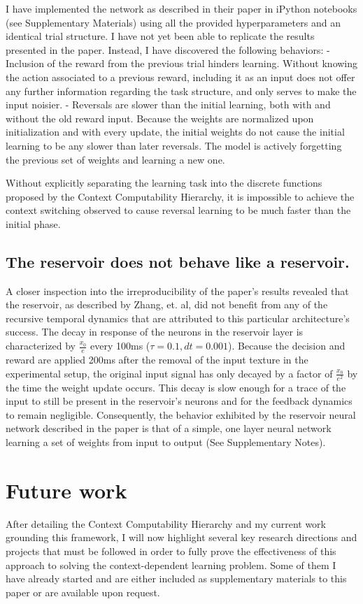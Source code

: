 \documentclass[]{article}
\begin{document}
I have implemented the network as described in their paper in iPython notebooks (see Supplementary Materials) using all the provided hyperparameters and an identical trial structure.  I have not yet been able to replicate the results presented in the paper.  Instead, I have discovered the following behaviors:
- Inclusion of the reward from the previous trial hinders learning.  Without knowing the action associated to a previous reward, including it as an input does not offer any further information regarding the task structure, and only serves to make the input noisier.
- Reversals are slower than the initial learning, both with and without the old reward input.  Because the weights are normalized upon initialization and with every update, the initial weights do not cause the initial learning to be any slower than later reversals.  The model is actively forgetting the previous set of weights and learning a new one.

Without explicitly separating the learning task into the discrete functions proposed by the Context Computability Hierarchy, it is impossible to achieve the context switching observed to cause reversal learning to be much faster than the initial phase.

\subsection{The reservoir does not behave like a reservoir.}
A closer inspection into the irreproducibility of the paper's results revealed that the reservoir, as described by Zhang, et. al, did not benefit from any of the recursive temporal dynamics that are attributed to this particular architecture's success.  The decay in response of the neurons in the reservoir layer is characterized by $\frac{x_0}{e}$ every 100ms ($\tau=0.1, dt=0.001$).  Because the decision and reward are applied 200ms after the removal of the input texture in the experimental setup, the original input signal has only decayed by a factor of $\frac{x_0}{e^2}$ by the time the weight update occurs.  This decay is slow enough for a trace of the input to still be present in the reservoir's neurons and for the feedback dynamics to remain negligible.  Consequently, the behavior exhibited by the reservoir neural network described in the paper is that of a simple, one layer neural network learning a set of weights from input to output (See Supplementary Notes).



\section{Future work}
After detailing the Context Computability Hierarchy and my current work grounding this framework, I will now highlight several key research directions and projects that must be followed in order to fully prove the effectiveness of this approach to solving the context-dependent learning problem.  Some of them I have already started and are either included as supplementary materials to this paper or are available upon request.
\end{document}

